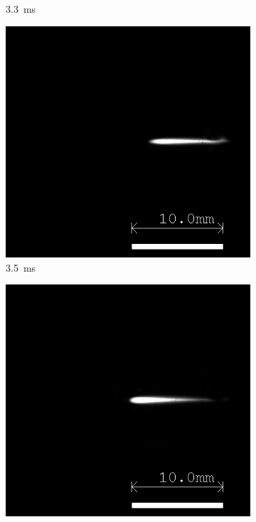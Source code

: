 \begin{figure}[h]
\begin{subfigure}[t]{0.3\textwidth}
        \caption{\qty{3.3}{ms}}
    \end{subfigure}
    \hfill
    \begin{subfigure}[t]{0.3\textwidth}
        \centering
        \includegraphics[width=\textwidth]{assets/4 experiments/V1 Spark Ignition Frames/LSP142_SPRK15_Fr35.bmp}
        \caption{\qty{3.5}{ms}}
    \end{subfigure}
    \begin{subfigure}[t]{0.3\textwidth}
        \centering
        \includegraphics[width=\textwidth]{assets/4 experiments/V1 Spark Ignition Frames/LSP142_SPRK15_Fr38.bmp}

\end{subfigure}
\end{figure}
